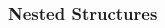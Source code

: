
\begin{frame}[fragile]
\frametitle{Nested Structures}
\begin{columns}[T]

\begin{column}{0.75\textwidth}

\end{column}

\begin{column}{0.20\textwidth}
\end{column}

\end{columns}
\end{frame}
\endinput

